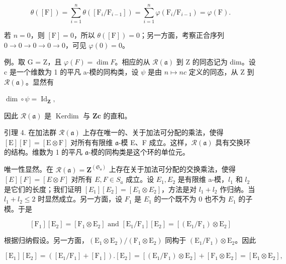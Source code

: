 \[
\theta ([ \mathrm{F} ]) = \sum_ {i = 1} ^ {n} \theta ([ \mathrm{F} _ {i} / \mathrm{F} _ {i - 1} ]) = \sum_ {i = 1} ^ {n} \varphi (\mathrm{F} _ {i} / \mathrm{F} _ {i - 1}) = \varphi (\mathrm{F}).
\]

若 \(n = 0\)，则 \([\mathrm{F}] = 0\)，所以 \(\theta([\mathrm{F}]) = 0\)；另一方面，考察正合序列 \(0 \longrightarrow 0 \longrightarrow 0 \longrightarrow 0 \longrightarrow 0\)，可见 \(\varphi(0) = 0\)。

例。取 G = Z，且 \(\varphi(F) = \dim F\)。相应的从 \(\mathcal{R}(\mathfrak{a})\) 到 Z 的同态记为 dim。设 c 是一个维数为 1 的平凡 a-模的同构类，设 \(\psi\) 是由 \(n \mapsto nc\) 定义的同态，从 Z 到 \(\mathcal{R}(\mathfrak{a})\)。显然有

\(\dim \circ \psi = \operatorname{Id}_{\mathbf{Z}},\)

因此 \(\mathcal{R}(\mathfrak{a})\) 是 \(\operatorname{Kerdim}\) 与 \(\mathbf{Zc}\) 的直和。

引理 4. 在加法群 \(\mathcal{R}(\mathfrak{a})\) 上存在唯一的、关于加法可分配的乘法，使得 \([\mathrm{E}][\mathrm{F}] = [\mathrm{E}\otimes \mathrm{F}]\) 对所有有限维 \(\mathfrak{a}\)-模 E、F 成立。这样，\(\mathcal{R}(\mathfrak{a})\) 具有交换环的结构。维数为 1 的平凡 \(\mathfrak{a}\)-模的同构类是这个环的单位元。

唯一性显然。在 \(\mathcal{R}(\mathfrak{a}) = \mathbf{Z}^{(\mathfrak{S}_{\mathfrak{a}})}\) 上存在关于加法可分配的交换乘法，使得 \([E][F] = [E \otimes F]\) 对所有 \(E, F \in S_{a}\) 成立。设 \(E_{1}, E_{2}\) 是有限维 a-模，\(l_{1}\) 和 \(l_{2}\) 是它们的长度；我们证明 \([E_{1}][E_{2}] = [E_{1} \otimes E_{2}]\)，方法是对 \(l_{1} + l_{2}\) 作归纳。当 \(l_{1} + l_{2} \leq 2\) 时显然成立。另一方面，设 \(F_{1}\) 是 \(E_{1}\) 的一个既不为 0 也不为 \(E_{1}\) 的子模。于是

\[
[ \mathrm{F} _ {1} ] [ \mathrm{E} _ {2} ] = [ \mathrm{F} _ {1} \otimes \mathrm{E} _ {2} ] \text { and } [ \mathrm{E} _ {1} / \mathrm{F} _ {1} ] [ \mathrm{E} _ {2} ] = [ (\mathrm{E} _ {1} / \mathrm{F} _ {1}) \otimes \mathrm{E} _ {2} ]
\]

根据归纳假设。另一方面，\((\mathrm{E}_1\otimes \mathrm{E}_2) / (\mathrm{F}_1\otimes \mathrm{E}_2)\) 同构于 \((\mathrm{E}_1 / \mathrm{F}_1)\otimes \mathrm{E}_2\)。因此

\[
[ \mathrm{E} _ {1} ] [ \mathrm{E} _ {2} ] = ([ \mathrm{E} _ {1} / \mathrm{F} _ {1} ] + [ \mathrm{F} _ {1} ]). [ \mathrm{E} _ {2} ] = [ (\mathrm{E} _ {1} / \mathrm{F} _ {1}) \otimes \mathrm{E} _ {2} ] + [ \mathrm{F} _ {1} \otimes \mathrm{E} _ {2} ] = [ \mathrm{E} _ {1} \otimes \mathrm{E} _ {2} ],
\]

